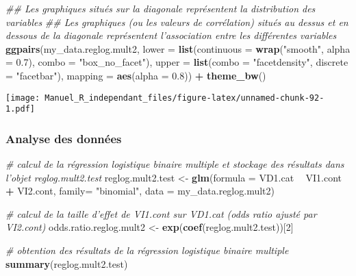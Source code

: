 \documentclass[
]{book}
\newenvironment{Shaded}{\begin{snugshade}}{\end{snugshade}}
\newcommand{\CommentTok}[1]{\textcolor[rgb]{0.56,0.35,0.01}{\textit{#1}}}
\newcommand{\DataTypeTok}[1]{\textcolor[rgb]{0.13,0.29,0.53}{#1}}
\newcommand{\DecValTok}[1]{\textcolor[rgb]{0.00,0.00,0.81}{#1}}
\newcommand{\FloatTok}[1]{\textcolor[rgb]{0.00,0.00,0.81}{#1}}
\newcommand{\KeywordTok}[1]{\textcolor[rgb]{0.13,0.29,0.53}{\textbf{#1}}}
\newcommand{\NormalTok}[1]{#1}
\newcommand{\OperatorTok}[1]{\textcolor[rgb]{0.81,0.36,0.00}{\textbf{#1}}}
\newcommand{\StringTok}[1]{\textcolor[rgb]{0.31,0.60,0.02}{#1}}
\begin{document}
\begin{Shaded}
\begin{Highlighting}[]
\CommentTok{## Les graphiques situés sur la diagonale représentent la distribution des variables}
\CommentTok{## Les graphiques (ou les valeurs de corrélation) situés au dessus et en dessous de la diagonale représentent l'association entre les différentes variables}
\KeywordTok{ggpairs}\NormalTok{(my_data.reglog.mult2,}
        \DataTypeTok{lower =} \KeywordTok{list}\NormalTok{(}\DataTypeTok{continuous =} \KeywordTok{wrap}\NormalTok{(}\StringTok{"smooth"}\NormalTok{, }\DataTypeTok{alpha =} \FloatTok{0.7}\NormalTok{), }\DataTypeTok{combo =} \StringTok{"box_no_facet"}\NormalTok{),}
        \DataTypeTok{upper =} \KeywordTok{list}\NormalTok{(}\DataTypeTok{combo =} \StringTok{"facetdensity"}\NormalTok{, }\DataTypeTok{discrete =} \StringTok{"facetbar"}\NormalTok{), }
        \DataTypeTok{mapping =} \KeywordTok{aes}\NormalTok{(}\DataTypeTok{alpha =} \FloatTok{0.8}\NormalTok{)) }\OperatorTok{+}\StringTok{ }\KeywordTok{theme_bw}\NormalTok{()}
\end{Highlighting}
\end{Shaded}

\texttt{[image: Manuel\_R\_independant\_files/figure-latex/unnamed-chunk-92-1.pdf]}

\hypertarget{analyse-des-donnuxe9es-10}{%
\subsubsection{Analyse des données}\label{analyse-des-donnuxe9es-10}}

\begin{Shaded}
\begin{Highlighting}[]
\CommentTok{# calcul de la régression logistique binaire multiple et stockage des résultats dans l’objet reglog.mult2.test}
\NormalTok{reglog.mult2.test <-}\StringTok{ }\KeywordTok{glm}\NormalTok{(}\DataTypeTok{formula =}\NormalTok{ VD1.cat }\OperatorTok{~}\StringTok{ }\NormalTok{VI1.cont }\OperatorTok{+}\StringTok{ }\NormalTok{VI2.cont, }
                         \DataTypeTok{family=} \StringTok{"binomial"}\NormalTok{, }
                         \DataTypeTok{data =}\NormalTok{ my_data.reglog.mult2)}

\CommentTok{# calcul de la taille d'effet de VI1.cont sur VD1.cat (odds ratio ajusté par VI2.cont)}
\NormalTok{odds.ratio.reglog.mult2 <-}\StringTok{ }\KeywordTok{exp}\NormalTok{(}\KeywordTok{coef}\NormalTok{(reglog.mult2.test))[}\DecValTok{2}\NormalTok{]}

\CommentTok{# obtention  des résultats de la régression logistique binaire multiple}
\KeywordTok{summary}\NormalTok{(reglog.mult2.test)}
\end{Highlighting}
\end{Shaded}
\end{document}
